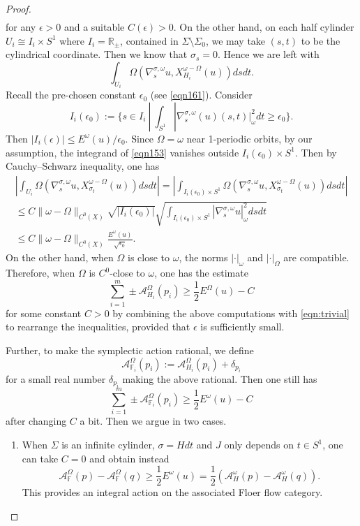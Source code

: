 \documentclass[reqno, 10pt]{amsart}
\numberwithin{equation}{section}
\numberwithin{equation}{section}
\theoremstyle{definition}
\theoremstyle{remark}
\newcommand{\beq}{\begin{equation}}
\newcommand{\eeq}{\end{equation}}
\newcommand{\beqn}{\begin{equation*}}
\newcommand{\eeqn}{\end{equation*}}
\newcommand{\mb}{\mathbb}
\newcommand{\mc}{\mathcal}
\begin{document}
\begin{proof}
\begin{multline*}
\end{multline*}
for any $\epsilon>0$ and a suitable $C(\epsilon)>0$. On the other hand, on each half cylinder $U_i\cong I_i \times S^1$ where $I_i = {\mb R}_\pm$, contained in $\Sigma \setminus \Sigma_0$, we may take $(s, t)$ to be the cylindrical coordinate. Then we know that $\sigma_s = 0$. Hence we are left with 
\beq\label{eqn153}
\int_{U_i} \Omega(\nabla_s^{\sigma, \omega}u, X_{H_i}^{\omega - \Omega}(u)) ds dt.
\eeq
Recall the pre-chosen constant $\epsilon_0$ (see \eqref{eqn161}). Consider 
\beqn
I_i(\epsilon_0):= \Big\{ s \in I_i \ |\ \int_{S^1} |\nabla_s^{\sigma, \omega}(u)(s, t)|_\omega^2 dt \geq \epsilon_0 \Big\}.
\eeqn
Then $|I_i(\epsilon)| \leq E^\omega(u) / \epsilon_0$. Since $\Omega = \omega$ near 1-periodic orbits, by our assumption, the integrand of \eqref{eqn153} vanishes outside $I_i(\epsilon_0)\times S^1$. Then by Cauchy--Schwarz inequality, one has 
\begin{multline*}
\left| \int_{U_i} \Omega( \nabla_s^{\sigma, \omega}u, X_{\sigma_t}^{\omega-\Omega}(u)) ds dt \right| = \left| \int_{I_i(\epsilon_0) \times S^1} \Omega(\nabla_s^{\sigma, \omega} u, X_{\sigma_t}^{\omega-\Omega}(u)) ds dt \right|  \\
\leq C \|\omega-\Omega\|_{C^0(X)} \sqrt{ |I_i(\epsilon_0)|} \sqrt{ \int_{I_i(\epsilon_0)\times S^1} |\nabla_s^{\sigma, \omega} u |_\omega^2 ds dt } \\
\leq C \| \omega- \Omega\|_{C^0(X)} \frac{ E^\omega(u)}{\sqrt{\epsilon_0}}. 
\end{multline*}
On the other hand, when $\Omega$ is close to $\omega$, the norms $|\cdot|_\omega$ and $|\cdot|_\Omega$ are compatible. Therefore, when $\Omega$ is $C^0$-close to $\omega$, one has the estimate
\beqn
\sum_{i=1}^m \pm {\mc A}_{H_i}^\Omega(p_i) \geq  \frac{1}{2} E^\Omega(u) - C
\eeqn
for some constant $C>0$ by combining the above computations with \eqref{eqn:trivial} to rearrange the inequalities, provided that $\epsilon$ is sufficiently small.

Further, to make the symplectic action rational, we define
\beqn
{\mc A}_{{\mb F}_i}^\Omega(p_i):= {\mc A}_{H_i}^\Omega(p_i) + \delta_{p_i}
\eeqn
for a small real number $\delta_{p_i}$ making the above rational. Then one still has 
\beqn
\sum_{i=1}^m \pm {\mc A}_{\mb{F}_i}^\Omega(p_i) \geq \frac{1}{2} E^\omega (u) - C
\eeqn
after changing $C$ a bit. Then we argue in two cases.

\begin{enumerate}

\item When $\Sigma$ is an infinite cylinder, $\sigma = H dt$ and $J$ only depends on $t \in S^1$, one can take $C = 0$ and obtain instead
\beqn
{\mc A}_{{\mb F}}^\Omega(p) - {\mc A}_{{\mb F}}^\Omega(q) \geq \frac{1}{2} E^\omega (u) = \frac{1}{2} ({\mc A}_H^\omega(p) - {\mc A}_H^\omega(q)). 
\eeqn
This provides an integral action on the associated Floer flow category.


\end{enumerate}
\end{proof}
\end{document}
